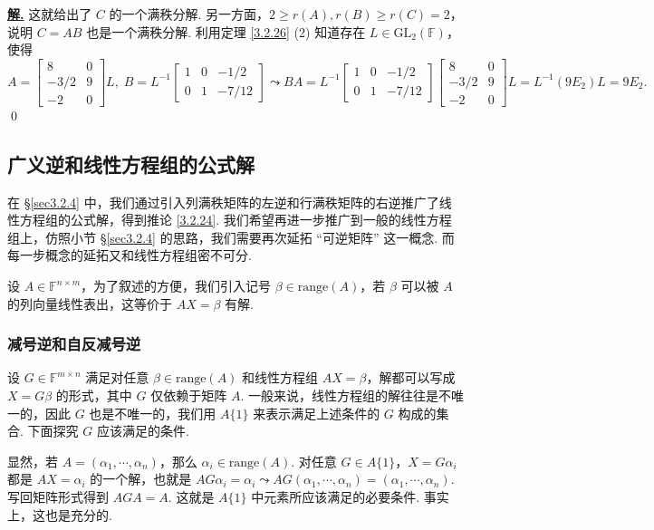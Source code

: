 \documentclass[10pt,openany]{article}
\theoremstyle{thmstyle} %
\theoremstyle{defstyle} %
\theoremstyle{prostyle} %
\theoremstyle{exastyle}
\theoremstyle{remstyle}
\newenvironment{solution}{\par\underline{\textbf{解.}} \;\fangsong}{\qed\par}
\newcommand{\F}{\mathbb{F}}
\newcommand{\mn}{^{m \times n}}
\newcommand{\nm}{^{n \times m}}
\begin{document}
\begin{solution}
	这就给出了 \( C \) 的一个满秩分解. 另一方面，\( 2 \geq r(A),r(B) \geq r(C)=2 \)，说明 \( C=AB \) 也是一个满秩分解. 利用定理 \ref{3.2.26} (2) 知道存在 \( L \in \text{GL}_2(\F) \)，使得
	\[ A=\begin{bmatrix}
		8 & 0  \\
		-3/2 & 9  \\
		-2 & 0 
	\end{bmatrix}L, \; B=L^{-1}\begin{bmatrix}
	1 & 0 & -1/2 \\
	0 & 1 & -7/12 
	\end{bmatrix} \leadsto BA=L^{-1}\begin{bmatrix}
	1 & 0 & -1/2 \\
	0 & 1 & -7/12 
	\end{bmatrix}\begin{bmatrix}
	8 & 0  \\
	-3/2 & 9  \\
	-2 & 0 
	\end{bmatrix}L=L^{-1}(9E_2)L=9E_2. \]
\end{solution}

\subsection{广义逆和线性方程组的公式解} \label{sec3.3}

在 \S \ref{sec3.2.4} 中，我们通过引入列满秩矩阵的左逆和行满秩矩阵的右逆推广了线性方程组的公式解，得到推论 \ref{3.2.24}. 我们希望再进一步推广到一般的线性方程组上，仿照小节 \S \ref{sec3.2.4} 的思路，我们需要再次延拓 “可逆矩阵” 这一概念. 而每一步概念的延拓又和线性方程组密不可分.

设 \( A \in \F\nm \)，为了叙述的方便，我们引入记号 \( \beta \in \text{range}(A) \)，若 \( \beta \) 可以被 \( A \) 的列向量线性表出，这等价于 \( AX=\beta \) 有解. 


\subsubsection{减号逆和自反减号逆}


设 \( G \in \F\mn \) 满足对任意 \( \beta \in \text{range}(A) \) 和线性方程组 \( AX=\beta \)，解都可以写成 \( X=G\beta \) 的形式，其中 \( G \) 仅依赖于矩阵 \( A \). 一般来说，线性方程组的解往往是不唯一的，因此 \( G \) 也是不唯一的，我们用 \( A\{1\} \) 来表示满足上述条件的 \( G \) 构成的集合. 下面探究 \( G \) 应该满足的条件.

显然，若 \( A=(\alpha_1,\cdots,\alpha_n) \)，那么 \( \alpha_i \in \text{range}(A) \). 对任意 \( G \in A\{1\} \)，\( X=G\alpha_i \) 都是 \( AX=\alpha_i \) 的一个解，也就是 \( AG\alpha_i=\alpha_i \leadsto AG(\alpha_1,\cdots,\alpha_n)=(\alpha_1,\cdots,\alpha_n) \). 写回矩阵形式得到 \( AGA=A \). 这就是 \( A\{1\} \) 中元素所应该满足的必要条件. 事实上，这也是充分的.
\end{document}
